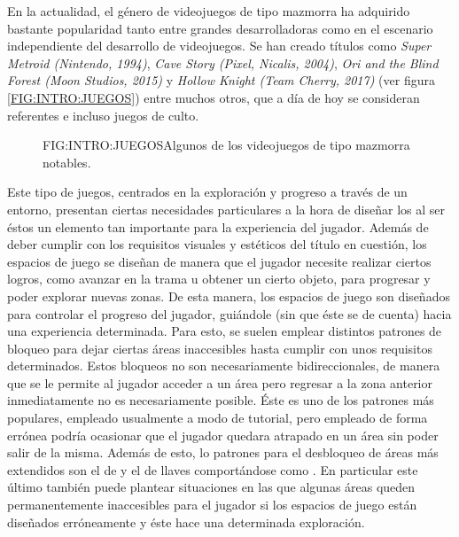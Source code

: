 En la actualidad, el género de videojuegos de tipo mazmorra ha adquirido bastante popularidad tanto entre grandes desarrolladoras como en el escenario independiente del desarrollo de videojuegos. Se han creado títulos como \textit{Super Metroid\cite{supermetroid} (Nintendo, 1994)}, \textit{Cave Story\cite{cavestory} (Pixel, Nicalis, 2004)}, \textit{Ori and the Blind Forest\cite{ori} (Moon Studios, 2015)} y \textit{Hollow Knight\cite{hollowknight} (Team Cherry, 2017)} (ver figura \ref{FIG:INTRO:JUEGOS}) entre muchos otros, que a día de hoy se consideran referentes e incluso juegos de culto.\newline
\begin{figure}{FIG:INTRO:JUEGOS}{Algunos de los videojuegos de tipo mazmorra notables.}
	 \quad
	 \quad
	 \quad
\end{figure}

Este tipo de juegos, centrados en la exploración y progreso a través de un entorno, presentan ciertas necesidades particulares a la hora de diseñar los  al ser éstos un elemento tan importante para la experiencia del jugador.
Además de deber cumplir con los requisitos visuales y estéticos del título en cuestión, los espacios de juego se diseñan de manera que el jugador necesite realizar ciertos logros, como avanzar en la trama u obtener un cierto objeto, para progresar y poder explorar nuevas zonas. De esta manera, los espacios de juego son diseñados para controlar el progreso del jugador, guiándole (sin que éste se de cuenta) hacia una experiencia determinada.\newline
Para esto, se suelen emplear distintos patrones de bloqueo para dejar ciertas áreas inaccesibles hasta cumplir con unos requisitos determinados.\newline
Estos bloqueos no son necesariamente bidireccionales, de manera que se le permite al jugador acceder a un área pero regresar a la zona anterior inmediatamente no es necesariamente posible. Éste es uno de los patrones más populares, empleado usualmente a modo de tutorial, pero empleado de forma errónea podría ocasionar que el jugador quedara atrapado en un área sin poder salir de la misma.\newline
Además de esto, lo patrones para el desbloqueo de áreas más extendidos son el de  y el de llaves comportándose como . En particular este último también puede plantear situaciones en las que algunas áreas queden permanentemente inaccesibles para el jugador si los espacios de juego están diseñados erróneamente y éste hace una determinada exploración.\newline

